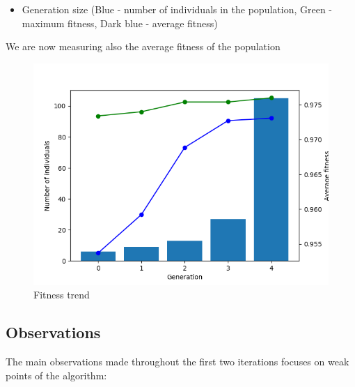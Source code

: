 \documentclass[11pt]{article}
\makeatletter
\def\maxwidth{\ifdim\Gin@nat@width>\linewidth\linewidth
    \else\Gin@nat@width\fi}
\let\Oldincludegraphics\includegraphics
\renewcommand{\includegraphics}[1]{\Oldincludegraphics[width=.8\maxwidth]{#1}}
\providecommand{\tightlist}{%
      \setlength{\itemsep}{0pt}\setlength{\parskip}{0pt}}
\makeatother
\begin{document}
\begin{itemize}
\tightlist
\item
  Generation size (Blue - number of individuals in the population, Green
  - maximum fitness, Dark blue - average fitness)
\end{itemize}

We are now measuring also the average fitness of the population

\begin{figure}
\centering
\includegraphics{gfx/generation-size-tne-2.png}
\caption{Fitness trend}
\end{figure}

    \hypertarget{observations}{%
\subsection{Observations}\label{observations}}

The main observations made throughout the first two iterations focuses
on weak points of the algorithm:
\end{document}
